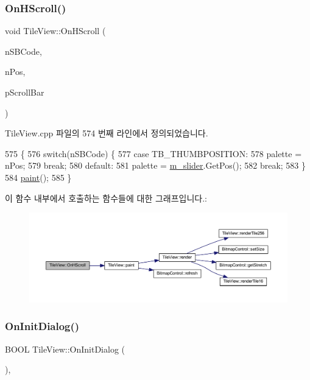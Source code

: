 \subsubsection{\texorpdfstring{On\+H\+Scroll()}{OnHScroll()}}
{\footnotesize\ttfamily void Tile\+View\+::\+On\+H\+Scroll (\begin{DoxyParamCaption}\item[{U\+I\+NT}]{n\+S\+B\+Code,  }\item[{U\+I\+NT}]{n\+Pos,  }\item[{C\+Scroll\+Bar $\ast$}]{p\+Scroll\+Bar }\end{DoxyParamCaption})\hspace{0.3cm}{\ttfamily [protected]}}



Tile\+View.\+cpp 파일의 574 번째 라인에서 정의되었습니다.


\begin{DoxyCode}
575 \{
576   \textcolor{keywordflow}{switch}(nSBCode) \{
577   \textcolor{keywordflow}{case} TB\_THUMBPOSITION:
578     palette = nPos;
579     \textcolor{keywordflow}{break};
580   \textcolor{keywordflow}{default}:
581     palette = \mbox{\hyperlink{class_tile_view_a3423f8bf0fe4b1bd0273d9ffbd3fb390}{m\_slider}}.GetPos();
582     \textcolor{keywordflow}{break};
583   \}
584   \mbox{\hyperlink{class_tile_view_a4341071a0cab0d5a8b6dfa7318230636}{paint}}();
585 \}
\end{DoxyCode}
이 함수 내부에서 호출하는 함수들에 대한 그래프입니다.\+:
\nopagebreak
\begin{figure}[H]
\begin{center}
\leavevmode
\includegraphics[width=350pt]{class_tile_view_a8ca2f73ad6c372183494c0870905b9ac_cgraph}
\end{center}
\end{figure}
\mbox{\label{class_tile_view_a597e32fa09187fe6ea909cca947bfbc1}} 
\subsubsection{\texorpdfstring{On\+Init\+Dialog()}{OnInitDialog()}}
{\footnotesize\ttfamily B\+O\+OL Tile\+View\+::\+On\+Init\+Dialog (\begin{DoxyParamCaption}{ }\end{DoxyParamCaption})\hspace{0.3cm}{\ttfamily [protected]}, {\ttfamily [virtual]}}



